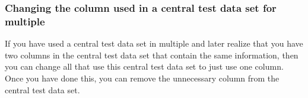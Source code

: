 \subsubsection{Changing the column used in a central test data set for multiple \gdcases{}}
\label{TasksChangeCTDSColumn}
If you have used a central test data set in multiple \gdcases{} and later realize that you have two columns in the central test data set that contain the same information, then you can change all \gdcases{} that use this central test data set to just use one column. Once you have done this, you can remove the unnecessary column from the central test data set. 



